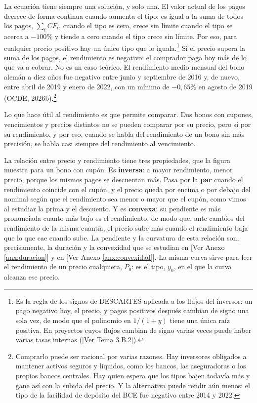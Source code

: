 \documentclass[10pt,a4paper]{article}
\newcommand{\authorfont}[1]{{\fontfamily{EBGaramond-TLF}\selectfont #1}}
\begin{document}
La ecuación tiene siempre una solución, y solo una. El valor actual de los pagos decrece de forma continua cuando aumenta el tipo: es igual a la suma de todos los pagos, $\sum_t CF_t$, cuando el tipo es cero, crece sin límite cuando el tipo se acerca a $-100\%$ y tiende a cero cuando el tipo crece sin límite. Por eso, para cualquier precio positivo hay un único tipo que lo iguala.\footnote{%
    Es la regla de los signos de DESCARTES aplicada a los flujos del inversor: un pago negativo hoy, el precio, y pagos positivos después cambian de signo una sola vez, de modo que el polinomio en $1/(1+y)$ tiene una única raíz positiva. En proyectos cuyos flujos cambian de signo varias veces puede haber varias tasas internas ([\authorfont{Ver Tema 3.B.2}]).
} Si el precio supera la suma de los pagos, el rendimiento es negativo: el comprador paga hoy más de lo que va a cobrar. No es un caso teórico. El rendimiento medio mensual del bono alemán a diez años fue negativo entre junio y septiembre de 2016 y, de nuevo, entre abril de 2019 y enero de 2022, con un mínimo de $-0{,}65\%$ en agosto de 2019 (OCDE, 2026b).\footnote{%
    Comprarlo puede ser racional por varias razones. Hay inversores obligados a mantener activos seguros y líquidos, como los bancos, las aseguradoras o los propios bancos centrales. Hay quien espera que los tipos bajen todavía más y gane así con la subida del precio. Y la alternativa puede rendir aún menos: el tipo de la facilidad de depósito del BCE fue negativo entre 2014 y 2022.
}

Lo que hace útil al rendimiento es que permite comparar. Dos bonos con cupones, vencimientos y precios distintos no se pueden comparar por su precio, pero sí por su rendimiento, y por eso, cuando se habla del rendimiento de un bono sin más precisión, se habla casi siempre del rendimiento al vencimiento.

La relación entre precio y rendimiento tiene tres propiedades, que la figura muestra para un bono con cupón. Es \textbf{inversa}: a mayor rendimiento, menor precio, porque los mismos pagos se descuentan más. Pasa por la \textbf{par} cuando el rendimiento coincide con el cupón, y el precio queda por encima o por debajo del nominal según que el rendimiento sea menor o mayor que el cupón, como vimos al estudiar la prima y el descuento. Y es \textbf{convexa}: su pendiente es más pronunciada cuanto más bajo es el rendimiento, de modo que, ante cambios del rendimiento de la misma cuantía, el precio sube más cuando el rendimiento baja que lo que cae cuando sube. La pendiente y la curvatura de esta relación son, precisamente, la duración y la convexidad que se estudian en [\authorfont{Ver Anexo \ref{anx:duracion}}] y en [\authorfont{Ver Anexo \ref{anx:convexidad}}]. La misma curva sirve para leer el rendimiento de un precio cualquiera, $P_0$: es el tipo, $y_0$, en el que la curva alcanza ese precio.
\end{document}
